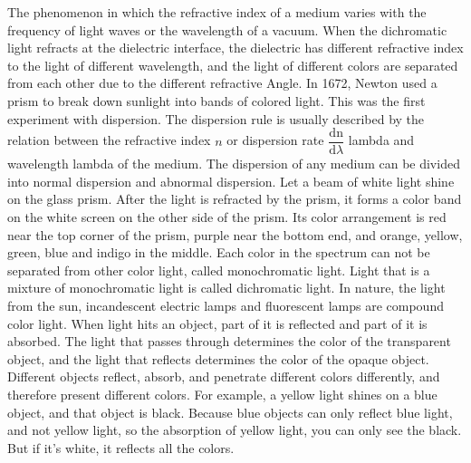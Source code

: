 \documentclass[a4paper]{article}
\begin{document}
The phenomenon in which the refractive index of a medium varies with the frequency of light waves or the wavelength of a vacuum. When the dichromatic light refracts at the dielectric interface, the dielectric has different refractive index to the light of different wavelength, and the light of different colors are separated from each other due to the different refractive Angle. In 1672, Newton used a prism to break down sunlight into bands of colored light.\cite{Optical Fibre} This was the first experiment with dispersion. The dispersion rule is usually described by the relation between the refractive index $n$ or dispersion rate $\dfrac{\mathrm{dn} }{\mathrm{d} \lambda }$ lambda and wavelength lambda of the medium. The dispersion of any medium can be divided into normal dispersion and abnormal dispersion. Let a beam of white light shine on the glass prism. After the light is refracted by the prism, it forms a color band on the white screen on the other side of the prism. Its color arrangement is red near the top corner of the prism, purple near the bottom end, and orange, yellow, green, blue and indigo in the middle. Each color in the spectrum can not be separated from other color light, called monochromatic light. Light that is a mixture of monochromatic light is called dichromatic light. In nature, the light from the sun, incandescent electric lamps and fluorescent lamps are compound color light. When light hits an object, part of it is reflected and part of it is absorbed. The light that passes through determines the color of the transparent object, and the light that reflects determines the color of the opaque object. Different objects reflect, absorb, and penetrate different colors differently, and therefore present different colors. For example, a yellow light shines on a blue object, and that object is black. Because blue objects can only reflect blue light, and not yellow light, so the absorption of yellow light, you can only see the black. But if it's white, it reflects all the colors.
\\

\end{document}
